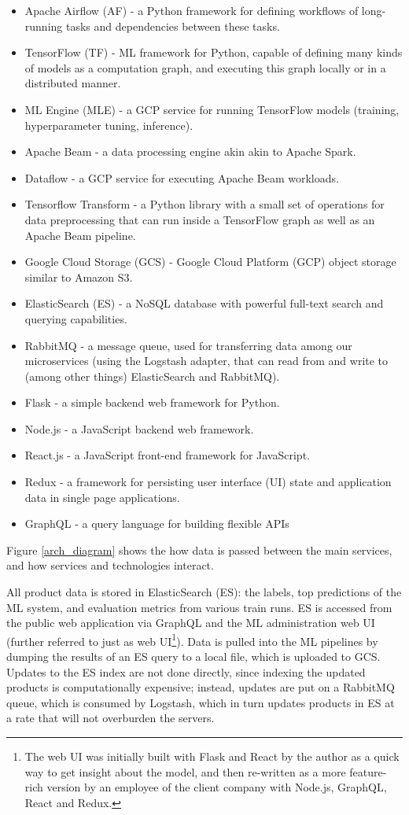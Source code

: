 \begin{itemize}
  \item Apache Airflow (AF) - a Python framework for defining workflows of long-running tasks and dependencies between these tasks.
  \item TensorFlow (TF) - ML framework for Python, capable of defining many kinds of models as a computation graph, and executing this graph locally or in a distributed manner.
  \item ML Engine (MLE) - a GCP service for running TensorFlow models (training, hyperparameter tuning, inference).
  \item Apache Beam - a data processing engine akin akin to Apache Spark.
  \item Dataflow - a GCP service for executing Apache Beam workloads.
  \item Tensorflow Transform - a Python library with a small set of operations for data preprocessing that can run inside a TensorFlow graph as well as an Apache Beam pipeline.
  \item Google Cloud Storage (GCS) - Google Cloud Platform (GCP) object storage similar to Amazon S3.
  \item ElasticSearch (ES) - a NoSQL database with powerful full-text search and querying capabilities.
  \item RabbitMQ - a message queue, used for transferring data among our microservices (using the Logstash adapter, that can read from and write to (among other things) ElasticSearch and RabbitMQ).
  \item Flask - a simple backend web framework for Python.
  \item Node.js - a JavaScript backend web framework.
  \item React.js - a JavaScript front-end framework for JavaScript.
  \item Redux - a framework for persisting user interface (UI) state and application data in single page applications.
  \item GraphQL - a query language for building flexible APIs
\end{itemize}

Figure \ref{arch_diagram} shows the how data is passed between the main services, and how services and technologies interact.

All product data is stored in ElasticSearch (ES): the labels, top predictions of the ML system, and evaluation metrics from various train runs.
ES is accessed from the public web application via GraphQL and the ML administration web UI (further referred to just as web UI\footnote{The web UI was initially built with Flask and React by the author as a quick way to get insight about the model, and then re-written as a more feature-rich version by an employee of the client company with Node.js, GraphQL, React and Redux.}).
Data is pulled into the ML pipelines by dumping the results of an ES query to a local file, which is uploaded to GCS.
Updates to the ES index are not done directly, since indexing the updated products is computationally expensive; instead, updates are put on a RabbitMQ queue, which is consumed by Logstash, which in turn updates products in ES at a rate that will not overburden the servers.

